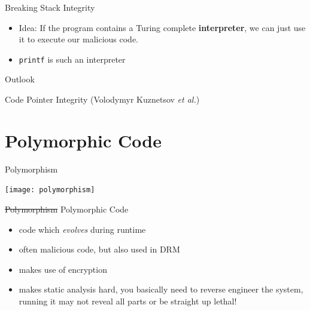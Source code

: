 \documentclass[beamer]{uibk}
\begin{document}
\begin{frame}{Breaking Stack Integrity}
    \begin{itemize}
        \item Idea: If the program contains a Turing complete
            \textbf{interpreter}, we can just use it to execute our malicious
            code.
        \bigskip
        \pause
        \item \texttt{printf} is such an interpreter
    \end{itemize}
\end{frame}

\begin{frame}{Outlook}
    \begin{center}
        Code Pointer Integrity \quad (Volodymyr Kuznetsov \textit{et al.})
    \end{center}
\end{frame}


\section{Polymorphic Code}

\begin{frame}{Polymorphism}
    \begin{center}
        \texttt{[image: polymorphism]}
    \end{center}
\end{frame}

\begin{frame}{\st{Polymorphism} Polymorphic Code}
    \begin{itemize}
        \item code which \emph{evolves} during runtime
        \item often malicious code, but also used in DRM
        \item makes use of encryption
        \medskip
        \pause
        \item makes static analysis hard, you basically need to reverse
            engineer the system,\\
            running it may not reveal all parts or be straight up lethal!
    \end{itemize}
\end{frame}
\end{document}
